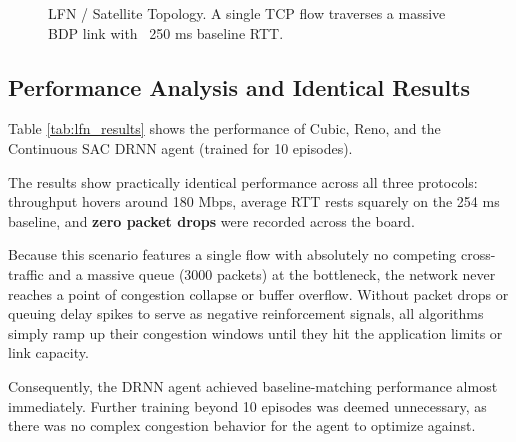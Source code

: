 \documentclass[12pt, a4paper]{article}
\begin{document}
\begin{figure}[H]
    \centering
    \caption{LFN / Satellite Topology. A single TCP flow traverses a massive BDP link with ~250 ms baseline RTT.}
    \label{fig:lfn_topo}
\end{figure}

\subsection*{Performance Analysis and Identical Results}

Table \ref{tab:lfn_results} shows the performance of Cubic, Reno, and the Continuous SAC DRNN agent (trained for 10 episodes). 

The results show practically identical performance across all three protocols: throughput hovers around 180 Mbps, average RTT rests squarely on the 254 ms baseline, and \textbf{zero packet drops} were recorded across the board. 

Because this scenario features a single flow with absolutely no competing cross-traffic and a massive queue (3000 packets) at the bottleneck, the network never reaches a point of congestion collapse or buffer overflow. Without packet drops or queuing delay spikes to serve as negative reinforcement signals, all algorithms simply ramp up their congestion windows until they hit the application limits or link capacity. 

Consequently, the DRNN agent achieved baseline-matching performance almost immediately. Further training beyond 10 episodes was deemed unnecessary, as there was no complex congestion behavior for the agent to optimize against.
\end{document}
